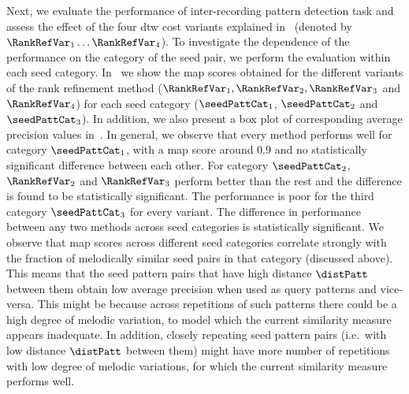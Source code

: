 Next, we evaluate the performance of inter-recording pattern detection task and assess the effect of the four \gls{dtw} cost variants explained in~ (denoted by $\RankRefVar_1 \dots \RankRefVar_4$). To investigate the dependence of the performance on the category of the seed pair, we perform the evaluation within each seed category. In~ we show the \gls{map} scores obtained for the different variants of the rank refinement method ($\RankRefVar_1, \RankRefVar_2, \RankRefVar_3$ and $\RankRefVar_4$) for each seed category ($\seedPattCat_1$, $\seedPattCat_2$ and $\seedPattCat_3$). In addition, we also present a box plot of corresponding average precision values in~. In general, we observe that every method performs well for category $\seedPattCat_1$, with a \gls{map} score around 0.9 and no statistically significant difference between each other. For category $\seedPattCat_2$, $\RankRefVar_2$ and $\RankRefVar_3$ perform better than the rest and the difference is found to be statistically significant. The performance is poor for the third category $\seedPattCat_3$ for every variant. The difference in performance between any two methods across seed categories is statistically significant. We observe that \gls{map} scores across different seed categories correlate strongly with the fraction of melodically similar seed pairs in that category (discussed above). This means that the seed pattern pairs that have high distance $\distPatt$ between them obtain low average precision when used as query patterns and vice-versa. This might be because across repetitions of such patterns there could be a high degree of melodic variation, to model which the current similarity measure appears inadequate. In addition, closely repeating seed pattern pairs (i.e.~with low distance $\distPatt$ between them) might have more number of repetitions with low degree of melodic variations, for which the current similarity measure performs well. 

